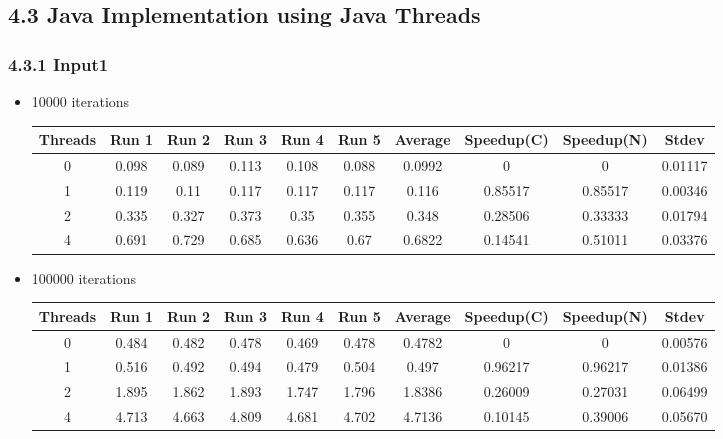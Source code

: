 \documentclass{article}
\begin{document}
\subsection*{4.3 Java Implementation using Java Threads}
\subsubsection*{4.3.1 Input1} 
 \begin{itemize}
\item 10000 iterations
\begin{center}
 \begin{adjustbox}{width=\columnwidth, center} 
 \begin{tabular}{ | |c | c c c c c | c | c c | c | |} \hline 
 Threads & Run 1 & Run 2 & Run 3 & Run 4 & Run 5 & Average & Speedup(C) & Speedup(N) & Stdev \\ [0.5ex] 
 \hline 
 \hline 
0& 0.098 & 0.089 & 0.113 & 0.108 & 0.088 & 0.0992 & 0 & 0 & 0.01117\\ 
 \hline
1& 0.119 & 0.11 & 0.117 & 0.117 & 0.117 & 0.116 & 0.85517 & 0.85517 & 0.00346\\ 
 \hline
2& 0.335 & 0.327 & 0.373 & 0.35 & 0.355 & 0.348 & 0.28506 & 0.33333 & 0.01794\\ 
 \hline
4& 0.691 & 0.729 & 0.685 & 0.636 & 0.67 & 0.6822 & 0.14541 & 0.51011 & 0.03376\\ 
 \hline
\end{tabular} 
 \end{adjustbox} 
 \end{center} 
\item 100000 iterations
\begin{center}
 \begin{adjustbox}{width=\columnwidth, center} 
 \begin{tabular}{ | |c | c c c c c | c | c c | c | |} \hline 
 Threads & Run 1 & Run 2 & Run 3 & Run 4 & Run 5 & Average & Speedup(C) & Speedup(N) & Stdev \\ [0.5ex] 
 \hline 
 \hline 
0& 0.484 & 0.482 & 0.478 & 0.469 & 0.478 & 0.4782 & 0 & 0 & 0.00576\\ 
 \hline
1& 0.516 & 0.492 & 0.494 & 0.479 & 0.504 & 0.497 & 0.96217 & 0.96217 & 0.01386\\ 
 \hline
2& 1.895 & 1.862 & 1.893 & 1.747 & 1.796 & 1.8386 & 0.26009 & 0.27031 & 0.06499\\ 
 \hline
4& 4.713 & 4.663 & 4.809 & 4.681 & 4.702 & 4.7136 & 0.10145 & 0.39006 & 0.05670\\ 
 \hline
\end{tabular} 
 \end{adjustbox} 
 \end{center} 
\end{itemize}
\end{document}
